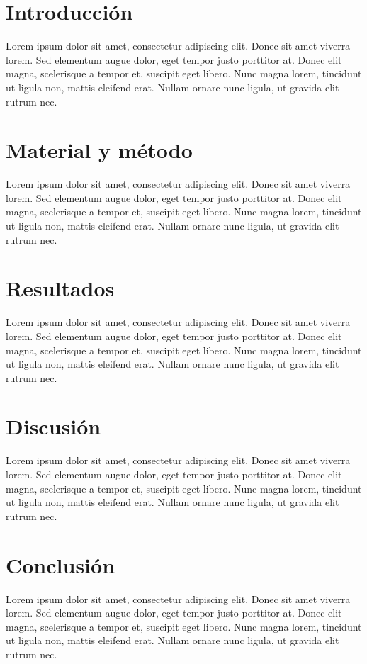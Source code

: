 \documentclass[a4paper, 10pt]{article}
\begin{document}
	\begin{multicols}{2}
		\section{Introducción}
		Lorem ipsum dolor sit amet, consectetur adipiscing elit. Donec sit amet viverra lorem. Sed elementum augue dolor, eget tempor justo porttitor at. Donec elit magna, scelerisque a tempor et, suscipit eget libero. Nunc magna lorem, tincidunt ut ligula non, mattis eleifend erat. Nullam ornare nunc ligula, ut gravida elit rutrum nec. 
		
		\section{Material y método}
		Lorem ipsum dolor sit amet, consectetur adipiscing elit. Donec sit amet viverra lorem. Sed elementum augue dolor, eget tempor justo porttitor at. Donec elit magna, scelerisque a tempor et, suscipit eget libero. Nunc magna lorem, tincidunt ut ligula non, mattis eleifend erat. Nullam ornare nunc ligula, ut gravida elit rutrum nec.
		
		\section{Resultados}
		Lorem ipsum dolor sit amet, consectetur adipiscing elit. Donec sit amet viverra lorem. Sed elementum augue dolor, eget tempor justo porttitor at. Donec elit magna, scelerisque a tempor et, suscipit eget libero. Nunc magna lorem, tincidunt ut ligula non, mattis eleifend erat. Nullam ornare nunc ligula, ut gravida elit rutrum nec.
		
		\section{Discusión}
		Lorem ipsum dolor sit amet, consectetur adipiscing elit. Donec sit amet viverra lorem. Sed elementum augue dolor, eget tempor justo porttitor at. Donec elit magna, scelerisque a tempor et, suscipit eget libero. Nunc magna lorem, tincidunt ut ligula non, mattis eleifend erat. Nullam ornare nunc ligula, ut gravida elit rutrum nec.
		
		\section{Conclusión}
		Lorem ipsum dolor sit amet, consectetur adipiscing elit. Donec sit amet viverra lorem. Sed elementum augue dolor, eget tempor justo porttitor at. Donec elit magna, scelerisque a tempor et, suscipit eget libero. Nunc magna lorem, tincidunt ut ligula non, mattis eleifend erat. Nullam ornare nunc ligula, ut gravida elit rutrum nec.
	\end{multicols}
	
\end{document}
